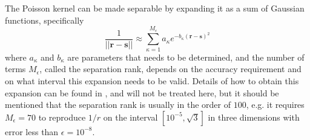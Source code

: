 \noindent
The Poisson kernel can be made separable by expanding it as a
sum of Gaussian functions, specifically
\begin{equation}
	\label{eq:poissonexp}
	\frac{1}{||\boldsymbol{r}-\boldsymbol{s}||} \approx
	\sum_{\kappa=1}^{M_\epsilon}a_\kappa e^{-b_\kappa
	(\boldsymbol{r}-\boldsymbol{s})^2}
\end{equation}
where $a_\kappa$ and $b_\kappa$ are parameters that needs to be determined,
and the number of terms $M_\epsilon$, called the separation rank, depends on 
the accuracy requirement and on what interval this expansion needs to be
valid. Details of how to obtain this expansion can be found in 
\cite{Fossgaard}, and
will not be treated here, but it should be mentioned that the separation rank
is usually in the order of $100$, e.g. it requires $M_\epsilon = 70$ to
reproduce $1/r$ on the interval $[10^{-5}, \sqrt{3}]$ in three dimensions with
error less than $\epsilon = 10^{-8}$.\\
\pagebreak

